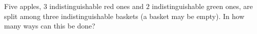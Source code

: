 Five apples, $3$ indistinguishable red ones and $2$ indistinguishable green ones, are split among three indistinguishable baskets (a basket may be empty). In how many ways can this be done?

